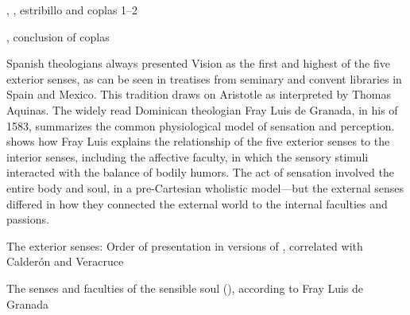 \begin{expoem}
  \caption{, , estribillo and coplas 1--2}
  \label{expoem:Si_los_sentidos-Sanchez-estribillo}
\end{expoem}
\begin{expoem}
  \caption{, conclusion of coplas}
  \label{expoem:Si_los_sentidos-Sanchez-coplas}
\end{expoem}


Spanish theologians always presented Vision as the first and highest of the five exterior senses, as can be seen in treatises from seminary and convent libraries in Spain and Mexico.
This tradition draws on Aristotle as interpreted by Thomas Aquinas.
The widely read Dominican theologian Fray Luis de Granada, in his  of 1583, summarizes the common physiological model of sensation and perception.
 shows how Fray Luis explains the relationship of the five exterior senses to the interior senses, including the affective faculty, in which the sensory stimuli interacted with the balance of bodily humors.
The act of sensation involved the entire body and soul, in a pre-Cartesian wholistic model---but the external senses differed in how they connected the external world to the internal faculties and passions.

\begin{table}
  \caption{The exterior senses: Order of presentation in versions of , correlated with Calderón and Veracruce}
  \label{table:senses-order}
\end{table}


\begin{table}
  \caption{The senses and faculties of the sensible soul (), according to Fray Luis de Granada}
  \label{table:senses-fray-luis}
\end{table}

